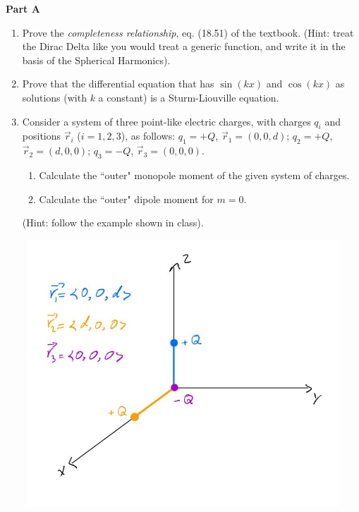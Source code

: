 \documentclass[fleqn]{article}
\begin{document}
  \textbf{Part A}
  \begin{enumerate}

    \item  Prove the \emph{completeness relationship}, eq. (18.51) of the textbook. (Hint: treat the Dirac Delta like you would treat a generic function, and write it in the basis of the Spherical Harmonics). 
    
    
    \item  Prove that the differential equation that has $\sin( k x)$ and $\cos(k x)$ as solutions (with $k$ a constant) is a Sturm-Liouville equation. 
    
    
    \item Consider a system of three point-like electric charges, with charges $q_i$ and positions $\vec r_i$ ($i=1,2,3$), as follows:
    $q_1=+Q$, $\vec r_1=(0,0,d)$; $q_2=+Q$, $\vec r_2=(d,0,0)$; $q_3=-Q$, $\vec r_3=(0,0,0)$.   
    
    \begin{enumerate}
      \item Calculate the ``outer" monopole moment of the given system of charges. 
      
      \item Calculate the ``outer" dipole moment for $m=0$. 
    
    \end{enumerate}
    (Hint: follow the example shown in class). 

    \includegraphics[height=10cm, width=12cm]{One.JPG}


\end{enumerate}
\end{document}
